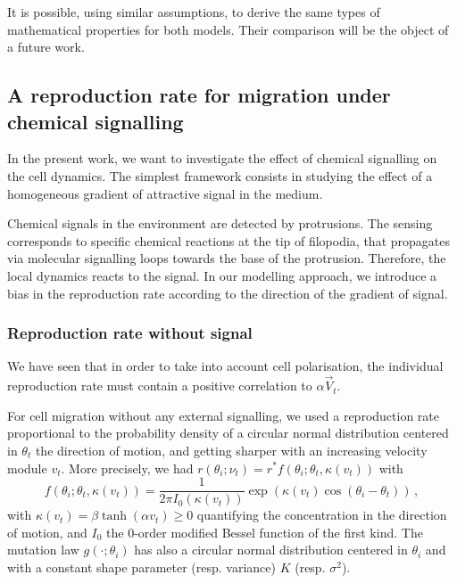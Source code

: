 \documentclass[a4paper,11pt]{article}
\begin{document}
It is possible, using similar assumptions, to derive the same types of mathematical properties for both models. Their comparison will be the object of a future work.  


\subsection{A reproduction rate for migration under chemical signalling}
In the present work, we want to investigate the effect of chemical signalling on the cell dynamics. The simplest framework consists in studying the effect of a homogeneous gradient of attractive signal in the medium. 

Chemical signals in the environment are detected by protrusions\citep{heckman2013filopodia}. The sensing corresponds to specific chemical reactions at the tip of filopodia, that propagates via molecular signalling loops towards the base of the protrusion. Therefore, the local dynamics reacts to the signal. In our modelling approach, we introduce a bias in the reproduction rate according to the direction of the gradient of signal. 


\subsubsection{Reproduction rate without signal}
We have seen that in order to take into account cell polarisation, the individual reproduction rate must contain a positive correlation to $\alpha \vec{V}_t$. \par 
For cell migration without any external signalling, we used a reproduction rate proportional to the probability density of a circular normal distribution centered in $\theta_t$ the direction of motion, and getting sharper with an increasing velocity module $v_t$. More precisely, we had $r(\theta_i;\nu_t) = r^* f(\theta_i; \theta_t,\kappa(v_t))$ with 
\begin{displaymath}
f(\theta_i; \theta_t,\kappa(v_t)) = \frac{1}{2\pi I_0(\kappa(v_t))} \exp(\kappa(v_t) \cos(\theta_i - \theta_t))\, ,
\end{displaymath}
with $\kappa (v_t) = \beta \tanh(\alpha v_t) \geq 0$ quantifying the concentration in the direction of motion, and $I_0$ the $0$-order modified Bessel function of the first kind. The mutation law $g(\cdot;\theta_i)$ has also a circular normal distribution centered in $\theta_i$ and with a constant shape parameter (resp. variance) $K$ (resp. $\sigma^2$). \par 
\end{document}
